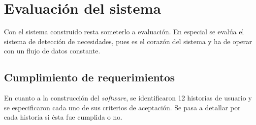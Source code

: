 \chapter{Evaluación del sistema}
\label{cap:experimentos}

Con el sistema construido resta someterlo a evaluación. En especial se evalúa el sistema de detección de necesidades, pues es el corazón del sistema y ha de operar con un flujo de datos constante.

\section{Cumplimiento de requerimientos}
\label{seC:cumpRequerimientos}

En cuanto a la construcción del \textit{software}, se identificaron 12 historias de usuario y se especificaron cada uno de sus criterios de aceptación. Se pasa a detallar por cada historia si ésta fue cumplida o no.

